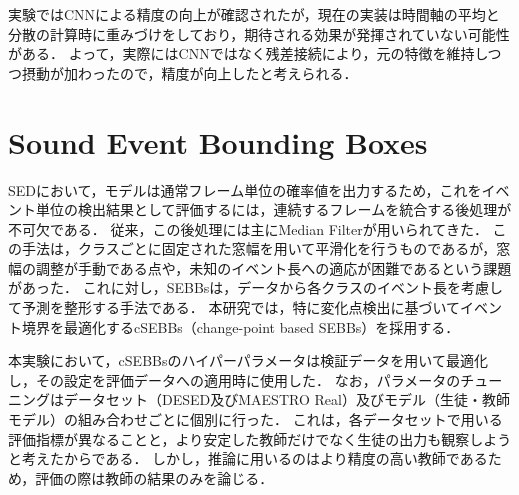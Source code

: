 \documentclass[main]{subfiles}
\begin{document}
実験ではCNNによる精度の向上が確認されたが，現在の実装は時間軸の平均と分散の計算時に重みづけをしており，期待される効果が発揮されていない可能性がある．
よって，実際にはCNNではなく残差接続により，元の特徴を維持しつつ摂動が加わったので，精度が向上したと考えられる．


\section{Sound Event Bounding Boxes}
\label{提案手法:SEBBs}
SEDにおいて，モデルは通常フレーム単位の確率値を出力するため，これをイベント単位の検出結果として評価するには，連続するフレームを統合する後処理が不可欠である．
従来，この後処理には主にMedian Filterが用いられてきた．
この手法は，クラスごとに固定された窓幅を用いて平滑化を行うものであるが，窓幅の調整が手動である点や，未知のイベント長への適応が困難であるという課題があった．
これに対し，SEBBsは，データから各クラスのイベント長を考慮して予測を整形する手法である．
本研究では，特に変化点検出に基づいてイベント境界を最適化するcSEBBs（change-point based SEBBs）を採用する．\par

本実験において，cSEBBsのハイパーパラメータは検証データを用いて最適化し，その設定を評価データへの適用時に使用した．
なお，パラメータのチューニングはデータセット（DESED及びMAESTRO Real）及びモデル（生徒・教師モデル）の組み合わせごとに個別に行った．
これは，各データセットで用いる評価指標が異なることと，より安定した教師だけでなく生徒の出力も観察しようと考えたからである．
しかし，推論に用いるのはより精度の高い教師であるため，評価の際は教師の結果のみを論じる．
\end{document}
